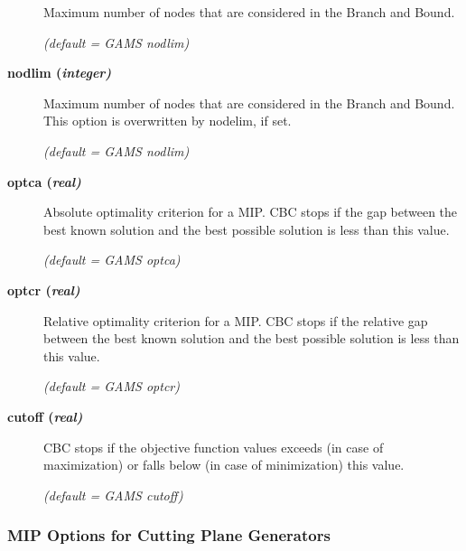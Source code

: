 \begin{description}
Maximum number of nodes that are considered in the Branch and Bound.

\textsl{(default = GAMS nodlim)}

\item[\label{nodlim}\hypertarget{nodlim}
{\textbf{nodlim (\slshape{integer})}}]\hspace{1.0in}

Maximum number of nodes that are considered in the Branch and Bound.
This option is overwritten by nodelim, if set.

\textsl{(default = GAMS nodlim)}

\item[\label{optca}\hypertarget{optca}
{\textbf{optca (\slshape{real})}}]\hspace{1.0in}

Absolute optimality criterion for a MIP.
CBC stops if the gap between the best known solution and the best possible solution is less than this value.

\textsl{(default = GAMS optca)}

\item[\label{optcr}\hypertarget{optcr}
{\textbf{optcr (\slshape{real})}}]\hspace{1.0in}

Relative optimality criterion for a MIP.
CBC stops if the relative gap between the best known solution and the best possible solution is less than this value.

\textsl{(default = GAMS optcr)}

\item[\label{cutoff}\hypertarget{cutoff}
{\textbf{cutoff (\slshape{real})}}]\hspace{1.0in}

CBC stops if the objective function values exceeds (in case of maximization) or falls below (in case of minimization) this value.

\textsl{(default = GAMS cutoff)}

\end{description}

\subsubsection{MIP Options for Cutting Plane Generators}

